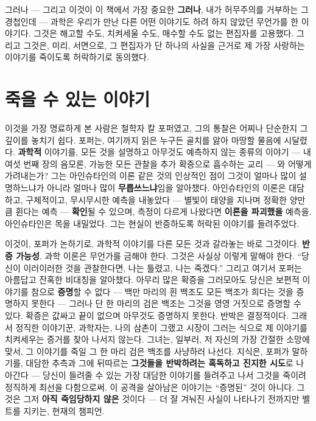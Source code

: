 그러나 — 그리고 이것이 이 책에서 가장 중요한 \textbf{그러나}, 내가 허무주의를 거부하는 그 경첩인데 — 과학은 우리가 만난 다른 어떤 이야기도 하려 하지 않았던 무언가를 한 이야기다. 그것은 해고할 수도, 치켜세울 수도, 매수할 수도 없는 편집자를 고용했다. 그리고 그것은, 미리, 서면으로, 그 편집자가 단 하나의 사실을 근거로 제 가장 사랑하는 이야기를 죽이도록 허락하기로 동의했다.

\section*{죽을 수 있는 이야기}

이것을 가장 명료하게 본 사람은 철학자 칼 포퍼였고, 그의 통찰은 어찌나 단순한지 그 깊이를 놓치기 쉽다. 포퍼는, 여기까지 읽은 누구든 골치를 앓아 마땅할 물음에 시달렸다. \textbf{과학적} 이야기를, 모든 것을 설명하고 아무것도 예측하지 않는 종류의 이야기 — 내 여섯 번째 장의 음모론, 가능한 모든 관찰을 추가 확증으로 흡수하는 교리 — 와 어떻게 가려내는가? 그는 아인슈타인의 이론 같은 것의 인상적인 점이 그것이 얼마나 많이 설명하느냐가 아니라 얼마나 많이 \textbf{무릅쓰느냐}임을 알아챘다. 아인슈타인의 이론은 대담하고, 구체적이고, 무시무시한 예측을 내놓았다 — 별빛이 태양을 지나며 정확한 양만큼 휜다는 예측 — \textbf{확인}될 수 있으며, 측정이 다르게 나왔다면 \textbf{이론을 파괴했을} 예측을. 아인슈타인은 목을 내밀었다. 그는 현실이 반증하도록 허락된 이야기를 들려주었다.

이것이, 포퍼가 논하기로, 과학적 이야기를 다른 모든 것과 갈라놓는 바로 그것이다. \textbf{반증 가능성}. 과학 이론은 무언가를 금해야 한다. 그것은 사실상 이렇게 말해야 한다. ``당신이 이러이러한 것을 관찰한다면, 나는 틀렸고, 나는 죽겠다.'' 그리고 여기서 포퍼는 아름답고 잔혹한 비대칭을 알아챘다. 아무리 많은 확증을 그러모아도 당신은 보편적 이야기를 참으로 \textbf{증명}할 수 없다 — 백만 마리의 흰 백조도 모든 백조가 희다는 것을 증명하지 못한다 — 그러나 단 한 마리의 검은 백조는 그것을 영영 거짓으로 증명할 수 있다. 확증은 값싸고 끝이 없으며 아무것도 증명하지 못한다. 반박은 결정적이다. 그래서 정직한 이야기꾼, 과학자는, 나의 삼촌이 그랬고 시장이 그러는 식으로 제 이야기를 치켜세우는 증거를 찾아 나서지 않는다. 그녀는, 일부러, 저 자신의 가장 간절한 소망에 맞서, 그 이야기를 죽일 그 한 마리 검은 백조를 사냥하러 나선다. 지식은, 포퍼가 말하기를, 대담한 추측과 그에 뒤따르는 \textbf{그것들을 반박하려는 혹독하고 진지한 시도}로 나아간다 — 당신이 들려줄 수 있는 가장 대담한 이야기를 들려주고 나서 그것을 죽이려 정직하게 최선을 다함으로써. 이 공격을 살아남은 이야기는 ``증명된'' 것이 아니다. 그것은 그저 \textbf{아직 죽임당하지 않은} 것이다 — 더 잘 겨눠진 사실이 나타나기 전까지만 벨트를 지키는, 현재의 챔피언.


